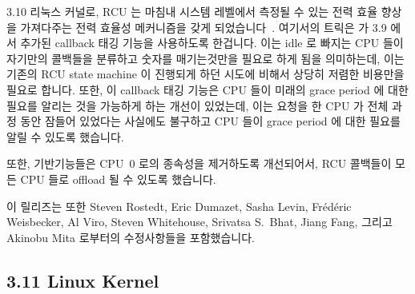 3.10 리눅스 커널로, RCU 는 마침내 시스템 레벨에서 측정될 수 있는 전력 효율
향상을 가져다주는 전력 효율성 메커니즘을 갖게
되었습니다~\cite{PaulMcKenney2013AMPenergyHOTPAR}.
여기서의 트릭은  가 3.9 에서 추가된 callback 태깅
기능을 사용하도록 한겁니다.
이는 idle 로 빠지는 CPU 들이 자기만의 콜백들을 분류하고 숫자를 매기는것만을
필요로 하게 됨을 의미하는데, 이는 기존의 RCU state machine 이 진행되게 하던
시도에 비해서 상당히 저렴한 비용만을 필요로 합니다.
또한, 이 callback 태깅 기능은 CPU 들이 미래의 grace period 에 대한 필요를
알리는 것을 가능하게 하는 개선이 있었는데, 이는 요청을 한 CPU 가 전체 과정 동안
잠들어 있었다는 사실에도 불구하고 CPU 들이 grace period 에 대한 필요를 알릴 수
있도록 했습니다.

또한,  기반기능들은 CPU~0 로의 종속성을 제거하도록
개선되어서, RCU 콜백들이 모든 CPU 들로 offload 될 수 있도록 했습니다.

이 릴리즈는 또한 Steven Rostedt, Eric Dumazet, Sasha Levin, Fr\'ed\'eric
Weisbecker, Al Viro, Steven Whitehouse, Srivatsa S.~Bhat, Jiang Fang, 그리고
Akinobu Mita 로부터의 수정사항들을 포함했습니다.

\subsection{3.11 Linux Kernel}


